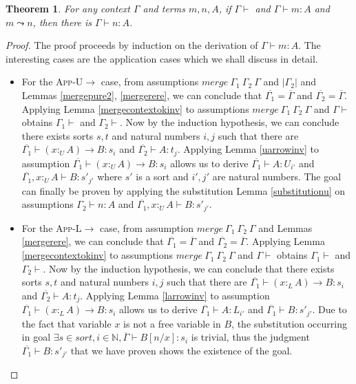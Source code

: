 \documentclass{article}
\newtheorem{theorem}{Theorem}[section]
\theoremstyle{definition}
\newcommand{\rname}[1]{\textsc{\footnotesize #1}}
\newcommand{\pure}[1]{|#1|}
\newcommand{\utype}{:_{\scriptscriptstyle U}}
\newcommand{\ltype}{:_{\scriptscriptstyle L}}
\newcommand{\step}{\leadsto}
\newcommand{\mrg}[3]{merge\ {#1}\ {#2}\ {#3}}
\begin{document}
\begin{theorem}
  For any context $\Gamma$ and terms $m, n, A$, if $\Gamma \vdash$ and $\Gamma \vdash m : A$ and $m \step n$, then there is $\Gamma \vdash n : A$.
\end{theorem}
\begin{proof}
  The proof proceeds by induction on the derivation of $\Gamma \vdash m : A$. The interesting cases are the application cases which we shall discuss in detail.
  \begin{itemize}
    \item For the \rname{App-U$\rightarrow$} case, from assumptions $\mrg{\Gamma_1}{\Gamma_2}{\Gamma}$ and $\pure{\Gamma_2}$ and Lemmas \ref{mergepure2}, \ref{mergerere}, we can conclude that $\overline{\Gamma_1} = \overline{\Gamma}$ and $\overline{\Gamma_2} = \overline{\Gamma}$. Applying Lemma \ref{mergecontextokinv} to assumptions $\mrg{\Gamma_1}{\Gamma_2}{\Gamma}$ and $\Gamma \vdash$ obtains $\Gamma_1 \vdash$ and $\Gamma_2 \vdash$. Now by the induction hypothesis, we can conclude there exists sorts $s, t$ and natural numbers $i, j$ such that there are $\overline{\Gamma_1} \vdash (x \utype A) \rightarrow B : s_i$ and $\overline{\Gamma_2} \vdash A : t_j$. Applying Lemma \ref{uarrowinv} to assumption $\overline{\Gamma_1} \vdash (x \utype A) \rightarrow B : s_i$ allows us to derive $\overline{\Gamma_1} \vdash A : U_{i'}$ and $\overline{\Gamma_1}, x \utype A \vdash B : s'_{j'}$ where $s'$ is a sort and $i', j'$ are natural numbers. The goal can finally be proven by applying the substitution Lemma \ref{substitutionu} on assumptions $\Gamma_2 \vdash n : A$ and $\overline{\Gamma_1}, x \utype A \vdash B : s'_{j'}$.
    \item For the \rname{App-L$\rightarrow$} case, from assumption $\mrg{\Gamma_1}{\Gamma_2}{\Gamma}$ and Lemmas \ref{mergerere}, we can conclude that $\overline{\Gamma_1} = \overline{\Gamma}$ and $\overline{\Gamma_2} = \overline{\Gamma}$. Applying Lemma \ref{mergecontextokinv} to assumptions $\mrg{\Gamma_1}{\Gamma_2}{\Gamma}$ and $\Gamma \vdash$ obtains $\Gamma_1 \vdash$ and $\Gamma_2 \vdash$. Now by the induction hypothesis, we can conclude that there exists sorts $s, t$ and natural numbers $i, j$ such that there are $\overline{\Gamma_1} \vdash (x \ltype A) \rightarrow B : s_i$ and $\overline{\Gamma_2} \vdash A : t_j$. Applying Lemma \ref{larrowinv} to assumption $\overline{\Gamma_1} \vdash (x \ltype A) \rightarrow B : s_i$ allows us to derive $\overline{\Gamma_1} \vdash A : L_{i'}$ and $\overline{\Gamma_1} \vdash B : s'_{j'}$. Due to the fact that variable $x$ is not a free variable in $B$, the substitution occurring in goal $\exists s \in sort, i \in \mathbb{N}, \overline{\Gamma} \vdash B[n/x] : s_i$ is trivial, thus the judgment $\overline{\Gamma_1} \vdash B : s'_{j'}$ that we have proven shows the existence of the goal.

\end{itemize}
\end{proof}
\end{document}
